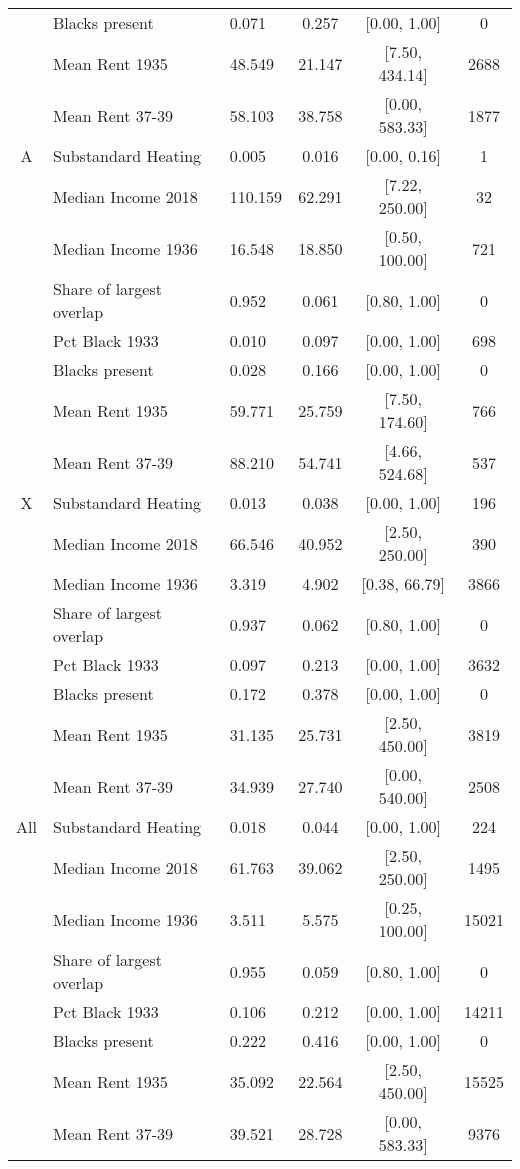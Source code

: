 \documentclass[border=1mm, preview]{standalone}
\begin{document}
\begin{table}
{\begin{tabular}[t]{cllccc}
 & Blacks present & 0.071 & 0.257 & {}[0.00, 1.00] & 0\\
 & Mean Rent 1935 & 48.549 & 21.147 & {}[7.50, 434.14] & 2688\\
 & Mean Rent 37-39 & 58.103 & 38.758 & {}[0.00, 583.33] & 1877\\
A & Substandard Heating & 0.005 & 0.016 & {}[0.00, 0.16] & 1\\
 & Median Income 2018 & 110.159 & 62.291 & {}[7.22, 250.00] & 32\\
 & Median Income 1936 & 16.548 & 18.850 & {}[0.50, 100.00] & 721\\
 & Share of largest overlap & 0.952 & 0.061 & {}[0.80, 1.00] & 0\\
 & Pct Black 1933 & 0.010 & 0.097 & {}[0.00, 1.00] & 698\\
 & Blacks present & 0.028 & 0.166 & {}[0.00, 1.00] & 0\\
 & Mean Rent 1935 & 59.771 & 25.759 & {}[7.50, 174.60] & 766\\
 & Mean Rent 37-39 & 88.210 & 54.741 & {}[4.66, 524.68] & 537\\
X & Substandard Heating & 0.013 & 0.038 & {}[0.00, 1.00] & 196\\
 & Median Income 2018 & 66.546 & 40.952 & {}[2.50, 250.00] & 390\\
 & Median Income 1936 & 3.319 & 4.902 & {}[0.38, 66.79] & 3866\\
 & Share of largest overlap & 0.937 & 0.062 & {}[0.80, 1.00] & 0\\
 & Pct Black 1933 & 0.097 & 0.213 & {}[0.00, 1.00] & 3632\\
 & Blacks present & 0.172 & 0.378 & {}[0.00, 1.00] & 0\\
 & Mean Rent 1935 & 31.135 & 25.731 & {}[2.50, 450.00] & 3819\\
 & Mean Rent 37-39 & 34.939 & 27.740 & {}[0.00, 540.00] & 2508\\
All & Substandard Heating & 0.018 & 0.044 & {}[0.00, 1.00] & 224\\
 & Median Income 2018 & 61.763 & 39.062 & {}[2.50, 250.00] & 1495\\
 & Median Income 1936 & 3.511 & 5.575 & {}[0.25, 100.00] & 15021\\
 & Share of largest overlap & 0.955 & 0.059 & {}[0.80, 1.00] & 0\\
 & Pct Black 1933 & 0.106 & 0.212 & {}[0.00, 1.00] & 14211\\
 & Blacks present & 0.222 & 0.416 & {}[0.00, 1.00] & 0\\
 & Mean Rent 1935 & 35.092 & 22.564 & {}[2.50, 450.00] & 15525\\
 & Mean Rent 37-39 & 39.521 & 28.728 & {}[0.00, 583.33] & 9376\\
\bottomrule
\end{tabular}}
\end{table}
\end{document}

